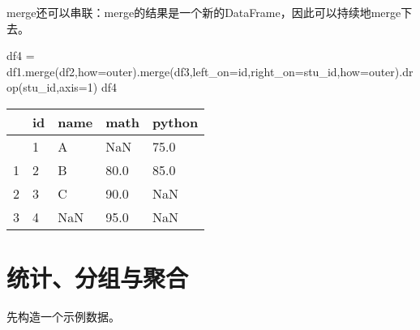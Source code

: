 \documentclass[
  letterpaper,
  DIV=11,
  numbers=noendperiod]{scrreprt}
\newenvironment{Shaded}{\begin{snugshade}}{\end{snugshade}}
\newcommand{\DecValTok}[1]{\textcolor[rgb]{0.68,0.00,0.00}{#1}}
\newcommand{\NormalTok}[1]{\textcolor[rgb]{0.00,0.23,0.31}{#1}}
\newcommand{\OperatorTok}[1]{\textcolor[rgb]{0.37,0.37,0.37}{#1}}
\newcommand{\StringTok}[1]{\textcolor[rgb]{0.13,0.47,0.30}{#1}}
\begin{document}
merge还可以串联：merge的结果是一个新的DataFrame，因此可以持续地merge下去。

\begin{Shaded}
\begin{Highlighting}[]
\NormalTok{df4 }\OperatorTok{=}\NormalTok{ df1.merge(df2,how}\OperatorTok{=}\StringTok{\textquotesingle{}outer\textquotesingle{}}\NormalTok{).merge(df3,left\_on}\OperatorTok{=}\StringTok{\textquotesingle{}id\textquotesingle{}}\NormalTok{,right\_on}\OperatorTok{=}\StringTok{\textquotesingle{}stu\_id\textquotesingle{}}\NormalTok{,how}\OperatorTok{=}\StringTok{\textquotesingle{}outer\textquotesingle{}}\NormalTok{).drop(}\StringTok{\textquotesingle{}stu\_id\textquotesingle{}}\NormalTok{,axis}\OperatorTok{=}\DecValTok{1}\NormalTok{)}
\NormalTok{df4}
\end{Highlighting}
\end{Shaded}

\begin{longtable}[]{@{}lllll@{}}
\toprule\noalign{}
& id & name & math & python \\
\midrule\noalign{}
\endhead
\bottomrule\noalign{}
\endlastfoot
0 & 1 & A & NaN & 75.0 \\
1 & 2 & B & 80.0 & 85.0 \\
2 & 3 & C & 90.0 & NaN \\
3 & 4 & NaN & 95.0 & NaN \\
\end{longtable}

\hypertarget{ux7edfux8ba1ux5206ux7ec4ux4e0eux805aux5408}{%
\section{统计、分组与聚合}\label{ux7edfux8ba1ux5206ux7ec4ux4e0eux805aux5408}}

先构造一个示例数据。
\end{document}

